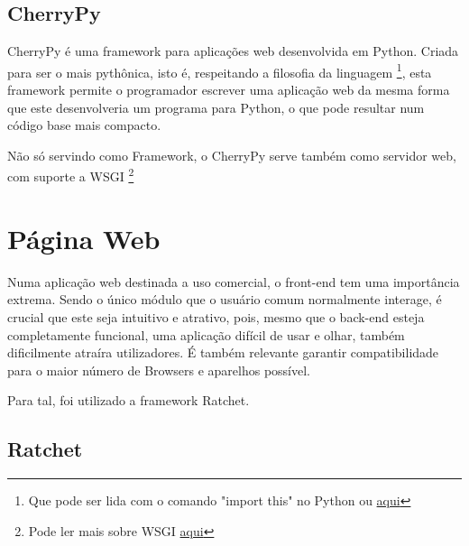 \documentclass{report}
\begin{document}
\subsection{CherryPy}
CherryPy é uma framework para aplicações web desenvolvida em Python. Criada para ser o mais  pythônica, isto é, respeitando a filosofia da linguagem \footnote{Que pode ser lida com o comando "import this" no Python ou \href{https://www.python.org/dev/peps/pep-0020/}{aqui}}, esta framework permite o programador escrever uma aplicação web da mesma forma que este desenvolveria um programa para Python, o que pode resultar num código base mais compacto. 

Não só servindo como Framework, o CherryPy serve também como servidor web, com suporte a \ac{WSGI} \footnote{Pode ler mais sobre \ac{WSGI} \href{http://wsgi.readthedocs.io/en/latest/}{aqui}} 






\section{Página Web}

Numa aplicação web destinada a uso comercial, o front-end tem uma importância extrema. Sendo o único módulo que o usuário comum normalmente interage, é crucial que este seja intuitivo e atrativo, pois, mesmo que o back-end esteja completamente funcional, uma aplicação difícil de usar e olhar, também dificilmente atraíra utilizadores. É também relevante garantir compatibilidade para o maior número de Browsers e aparelhos possível. 

Para tal, foi utilizado a framework Ratchet.

\subsection{Ratchet}
\end{document}
